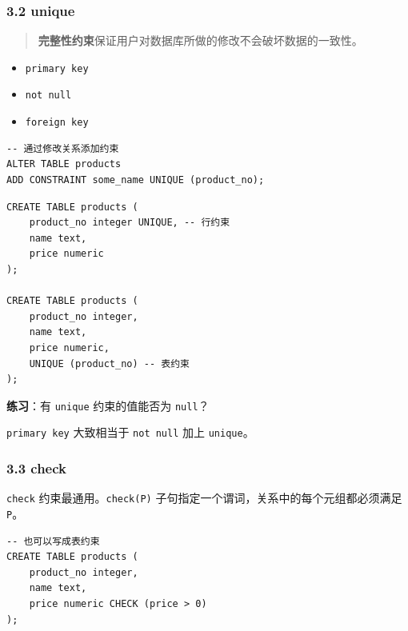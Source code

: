 \documentclass[aspectratio=169, 14pt]{beamer}
\begin{document}
\begin{frame}[fragile]
	\frametitle{3.2 unique}

	\begin{quote}
		\textbf{完整性约束}保证用户对数据库所做的修改不会破坏数据的一致性。
	\end{quote}

	\begin{itemize}
		\item \texttt{primary key}
		\item \texttt{not null}
		\item \texttt{foreign key}
	\end{itemize}
	\pause

	\begin{verbatim}
-- 通过修改关系添加约束
ALTER TABLE products 
ADD CONSTRAINT some_name UNIQUE (product_no);
\end{verbatim}

\end{frame}

\begin{frame}[fragile]

	\begin{verbatim}
CREATE TABLE products (
    product_no integer UNIQUE, -- 行约束
    name text,
    price numeric
);

CREATE TABLE products (
    product_no integer,
    name text,
    price numeric,
    UNIQUE (product_no) -- 表约束
);
    \end{verbatim}

	{\large {}}  \textbf{练习}：有 \texttt{unique} 约束的值能否为 \texttt{null}？

\end{frame}

{
\begin{frame}[standout]
	\texttt{primary key} 大致相当于 \texttt{not null} 加上 \texttt{unique}。
\end{frame}
}

\begin{frame}[fragile]
	\frametitle{3.3 check}
	\texttt{check} 约束最通用。\texttt{check(P)} 子句指定一个谓词，关系中的每个元组都必须满足 \texttt{P}。

	\begin{verbatim}
-- 也可以写成表约束
CREATE TABLE products (
    product_no integer,
    name text,
    price numeric CHECK (price > 0)
);
\end{verbatim}

\end{frame}
\end{document}

